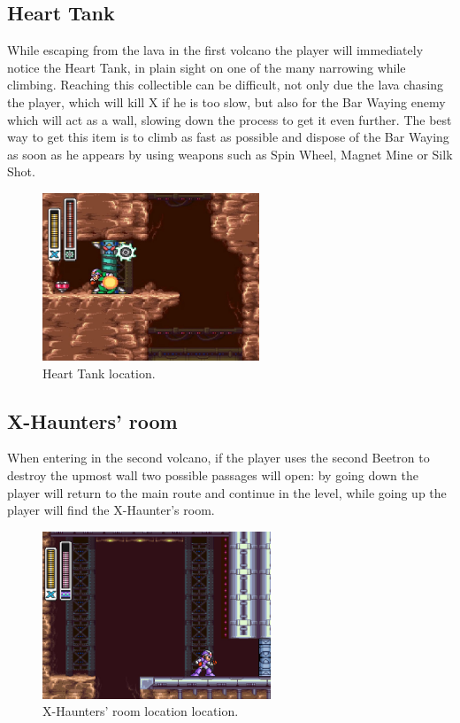 \subsection{Heart Tank}
While escaping from the lava in the first volcano the player will immediately notice the Heart Tank, in plain sight on one of the many narrowing while climbing. Reaching this collectible can be difficult, not only due the lava chasing the player, which will kill X if he is too slow, but also for the Bar Waying enemy which will act as a wall, slowing down the process to get it even further. The best way to get this item is to climb as fast as possible and dispose of the Bar Waying as soon as he appears by using weapons such as Spin Wheel, Magnet Mine or Silk Shot.
\begin{figure}[htp]
	\centering
	\includegraphics[height=5cm]{figures/X2/Flame_stag/Stag_heart.png}
	\caption{Heart Tank location.}
\end{figure}

\subsection{X-Haunters' room}
When entering in the second volcano, if the player uses the second Beetron to destroy the upmost wall two possible passages will open: by going down the player will return to the main route and continue in the level, while going up the player will find the X-Haunter's room.
\begin{figure}[htp]
	\centering
	\includegraphics[height=5cm]{figures/X2/Flame_stag/Stag_haunter_room.png}
	\caption{X-Haunters' room location location.}
\end{figure}


